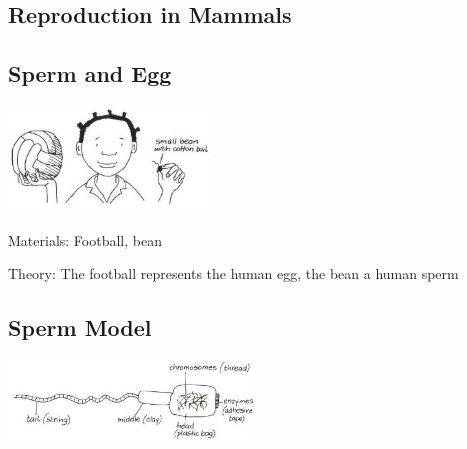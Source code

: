 \begin{multicols}{2}

\section*{Reproduction in Mammals} 


\subsection{Sperm and Egg} %

\begin{center}
\includegraphics[width=0.4\textwidth]{./img/vso/sperm-egg.jpg}
\end{center}

\begin{description*}
\item[Materials:]{Football, bean}
\item[Theory:]{The football represents the
human egg, the bean a human
sperm}
\end{description*}

\columnbreak

\subsection{Sperm Model}

\begin{center}
\includegraphics[width=0.49\textwidth]{./img/vso/sperm-model.jpg}
\end{center}


\end{multicols}
